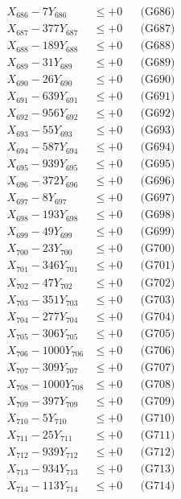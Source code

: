 \documentclass[a4paper,10pt]{article}
\begin{document}
{\begin{align}
X_{686} - 7Y_{686} &\leq +0 && \text{(G686)} \\
X_{687} - 377Y_{687} &\leq +0 && \text{(G687)} \\
X_{688} - 189Y_{688} &\leq +0 && \text{(G688)} \\
X_{689} - 31Y_{689} &\leq +0 && \text{(G689)} \\
X_{690} - 26Y_{690} &\leq +0 && \text{(G690)} \\
\allowbreak
X_{691} - 639Y_{691} &\leq +0 && \text{(G691)} \\
X_{692} - 956Y_{692} &\leq +0 && \text{(G692)} \\
X_{693} - 55Y_{693} &\leq +0 && \text{(G693)} \\
X_{694} - 587Y_{694} &\leq +0 && \text{(G694)} \\
X_{695} - 939Y_{695} &\leq +0 && \text{(G695)} \\
X_{696} - 372Y_{696} &\leq +0 && \text{(G696)} \\
X_{697} - 8Y_{697} &\leq +0 && \text{(G697)} \\
X_{698} - 193Y_{698} &\leq +0 && \text{(G698)} \\
X_{699} - 49Y_{699} &\leq +0 && \text{(G699)} \\
X_{700} - 23Y_{700} &\leq +0 && \text{(G700)} \\
\allowbreak
X_{701} - 346Y_{701} &\leq +0 && \text{(G701)} \\
X_{702} - 47Y_{702} &\leq +0 && \text{(G702)} \\
X_{703} - 351Y_{703} &\leq +0 && \text{(G703)} \\
X_{704} - 277Y_{704} &\leq +0 && \text{(G704)} \\
X_{705} - 306Y_{705} &\leq +0 && \text{(G705)} \\
X_{706} - 1000Y_{706} &\leq +0 && \text{(G706)} \\
X_{707} - 309Y_{707} &\leq +0 && \text{(G707)} \\
X_{708} - 1000Y_{708} &\leq +0 && \text{(G708)} \\
X_{709} - 397Y_{709} &\leq +0 && \text{(G709)} \\
X_{710} - 5Y_{710} &\leq +0 && \text{(G710)} \\
\allowbreak
X_{711} - 25Y_{711} &\leq +0 && \text{(G711)} \\
X_{712} - 939Y_{712} &\leq +0 && \text{(G712)} \\
X_{713} - 934Y_{713} &\leq +0 && \text{(G713)} \\
X_{714} - 113Y_{714} &\leq +0 && \text{(G714)} \\

\end{align}}
\end{document}

